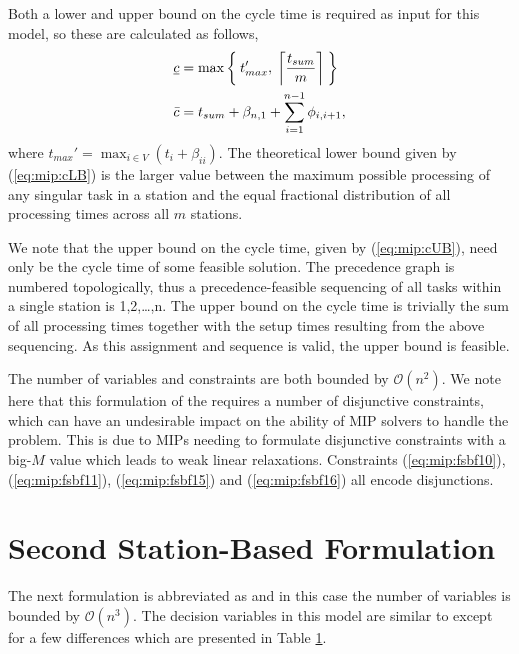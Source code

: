 Both a lower and upper bound on the cycle time is required as input for
this model, so these are calculated as follows,
\begin{align}
	\underline{c} &=\max\left\{\: t_{max}',\:\left\lceil \frac{t_{sum}}{m} \right\rceil \:\right\} \label{eq:mip:cLB}\\
	\bar{c} &=t_{sum} + \beta_{n,1} + \sum_{i=1}^{n-1} \phi_{i,i+1}, \label{eq:mip:cUB}
\end{align}
where $t_{max}'=\max_{i\in V}(t_i+\beta_{ii})$.
The theoretical lower bound given by (\ref{eq:mip:cLB})
is the larger value between the maximum possible processing of any singular task
in a station and the equal fractional distribution of all processing times across 
all $m$ stations.

We note that the upper bound on the cycle time, given by (\ref{eq:mip:cUB}), need only be the cycle
time of some feasible solution.
The precedence graph is numbered topologically,
thus a precedence-feasible sequencing
of all tasks within a single station is 1,2,\ldots,n.
The upper bound on the cycle time is trivially
the sum of all processing times together with the setup times
resulting from the above sequencing.
As this assignment and sequence is valid, the upper bound is feasible.

The number of variables and constraints are both bounded by $\mathcal{O}(n^2)$.
We note here that this formulation of the  requires a number
of disjunctive constraints, which can have an
undesirable impact on the ability of MIP solvers to
handle the problem.
This is due to MIPs needing to formulate disjunctive
constraints with a big-$M$ value which leads to weak
linear relaxations.	
Constraints (\ref{eq:mip:fsbf10}), (\ref{eq:mip:fsbf11}), 
(\ref{eq:mip:fsbf15}) and (\ref{eq:mip:fsbf16}) all encode disjunctions.

\section{Second Station-Based Formulation}
\label{sec:mip:ssbf}
The next formulation is abbreviated as \ssbf{}
and in this case the number of 
variables is bounded by $\mathcal{O}(n^3)$.
The decision variables in this model are similar
to  except for a few differences which
are presented in Table \ref{sec:mip:ssbf}.

